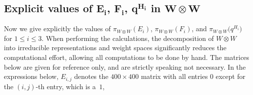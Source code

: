 \documentclass[pdftex]{sigma}
\numberwithin{equation}{section}
\theoremstyle{definition}
\begin{document}
\subsection[Explicit values of E\_i, F\_i, q\^{}\{H\_i\} in W otimes W]{Explicit values of $\boldsymbol{E_i}$, $\boldsymbol{F_i}$, $\boldsymbol{q^{H_i}}$ in $\boldsymbol{W \otimes W}$}
\label{subsection--EiFiqHi}
Now we give explicitly the values of $\pi_{W \otimes W}(E_i)$, $\pi_{W \otimes W}(F_i)$, and $\pi_{W \otimes W}\bigl(q^{H_i}\bigr)$ for $1 \le i \le 3$. When performing the calculations, the decomposition of $W\otimes W$ into irreducible representations and weight spaces significantly reduces the computational effort, allowing all computations to be done by hand. The matrices below are given for reference only, and are strictly speaking not necessary. In the expressions below, $E_{i,j}$ denotes the $400 \times 400$ matrix with all entries $0$ except for the $(i,j)$-th entry, which is a~$1$,
\end{document}
